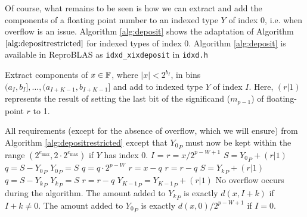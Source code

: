       Of course, what remains to be seen is how we can extract and add the
      components of a floating point number to an indexed type $Y$ of index 0,
      i.e. when overflow is an issue. Algorithm \ref{alg:deposit} shows the
      adaptation of Algorithm $\ref{alg:depositrestricted}$ for indexed types
      of index 0. Algorithm \ref{alg:deposit} is available in ReproBLAS as \texttt{idxd\_xixdeposit} in \texttt{idxd.h}

      \begin{samepage}
      \begin{alg}
        Extract components of $x \in \mathbb{F}$, where $|x| < 2^{b_I}$,
        in bins $(a_I,b_I], \ldots, (a_{I + K - 1}, b_{I + K - 1}]$
        and add to indexed type $Y$ of index $I$. Here, $(r | 1)$ represents
        the result of setting the last bit of the significand ($m_{p - 1}$) of
        floating-point $r$ to 1.
        \begin{algorithmic}[1]
          \Require
            \Statex All requirements (except for the absence of overflow, which we will ensure)
            from Algorithm \ref{alg:depositrestricted} except that ${Y_0}_P$
            must now be kept within the range $(2^{e_{\max}}, 2 \cdot 2^{e_{\max}})$ if $Y$ has index 0.
            \State $I$ = 
              \State $r = x / 2^{p - W + 1}$ \label{alg:deposit:scaler}
              \State $S = {Y_0}_P + (r | 1)$ \label{alg:deposit:formS}
              \State $q = S - {Y_0}_P$ \label{alg:deposit:formq}
              \State ${Y_0}_P = S$
              \State $q = q \cdot 2^{p - W}$ \label{alg:deposit:scaleq}
              \State $r = x - q$ \label{alg:deposit:formr}
              \State $r = r - q$ \label{alg:deposit:formragain}
                \State $S = {Y_k}_P + (r | 1)$
                \State $q = S - {Y_k}_P$
                \State ${Y_k}_P = S$
                \State $r = r - q$
              \EndFor
              \State ${Y_{K - 1}}_P = {Y_{K - 1}}_P + (r | 1)$
            \Else
              \State{} \label{alg:deposit:callrestricted}
            \EndIf
          \EndFunction
          \Ensure
            \Statex No overflow occurs during the algorithm.
            \Statex The amount added to ${Y_k}_P$ is exactly $d(x, I + k)$ if $I + k \neq 0$.
            \Statex The amount added to ${Y_0}_P$ is exactly $d(x, 0)/2^{p - W + 1}$ if $I = 0$.
        \end{algorithmic}
        \label{alg:deposit}
      \end{alg}
      \end{samepage}

